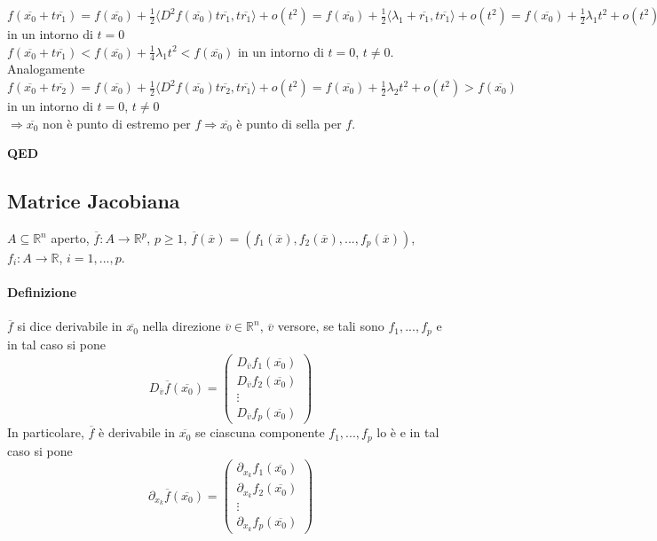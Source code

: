 \documentclass{article}
\newcommand{\R}{\mathbb{R}}
\begin{document}
\begin{enumerate}
    $f(\overline{x_0}+t\overline{r_1})=f(\overline{x_0})+\frac{1}{2}\langle D^2f(\overline{x_0})t\overline{r_1},t\overline{r_1} \rangle + o(t^2)=f(\overline{x_0})+\frac{1}{2}\langle \lambda_1 +\overline{r_1},t\overline{r_1}\rangle + o(t^2)=f(\overline{x_0})+\frac{1}{2}\lambda_1 t^2 + o(t^2)=f(\overline{x_0})+t^2(\frac{1}{2}\lambda_1+o(1)) \Rightarrow \frac{1}{2}\lambda_1+o(1) < \frac{1}{4}\lambda_1$ in un intorno di $t=0$\\
    $f(\overline{x_0}+t\overline{r_1})<f(\overline{x_0})+\frac{1}{4}\lambda_1 t^2< f(\overline{x_0})$ in un intorno di $t=0$, $t\neq 0$.\\
    Analogamente $f(\overline{x_0}+t\overline{r_2})=f(\overline{x_0})+\frac{1}{2}\langle D^2f(\overline{x_0})t\overline{r_2},t\overline{r_1} \rangle +o(t^2)=f(\overline{x_0})+\frac{1}{2}\lambda_2t^2+o(t^2)>f(\overline{x_0})$ in un intorno di $t=0$, $t \neq 0$\\
    $\Rightarrow \overline{x_0}$ non è punto di estremo per $f \Rightarrow \overline{x_0}$ è punto di sella per $f$. 
\end{enumerate}
\begin{flushright}
\textbf{QED}
\end{flushright}


\subsection{{Matrice Jacobiana}}
$A \subseteq \R^n$ aperto, $\overline{f}: A \rightarrow \R^p$, $p \geq 1$, $\overline{f}(\overline{x})=(f_1(\overline{x}),f_2(\overline{x}),...,f_p(\overline{x}))$, $f_i:A \rightarrow \R$, $ i =1,...,p$.

\paragraph{{Definizione}}
$\overline{f}$ si dice derivabile in $\overline{x_0}$ nella direzione $\overline{v}\in \R^n$, $\overline{v}$ versore, se tali sono $f_1,...,f_p$ e in tal caso si pone
\begin{equation*}
    D_{\overline{v}}\overline{f}(\overline{x_0})=\begin{pmatrix}
        D_{\overline{v}}f_1(\overline{x_0})\\
        D_{\overline{v}}f_2(\overline{x_0})\\
        \vdots\\
        D_{\overline{v}}f_p(\overline{x_0})
    \end{pmatrix}
\end{equation*}
In particolare, $\overline{f}$ è derivabile in $\overline{x_0}$ se ciascuna componente $f_1,...,f_p$ lo è e in tal caso si pone 
\begin{equation*}
    \partial_{x_k}\overline{f}(\overline{x_0})=\begin{pmatrix}
        \partial_{x_k}f_1(\overline{x_0})\\
        \partial_{x_k}f_2(\overline{x_0})\\
        \vdots\\
        \partial_{x_k}f_p(\overline{x_0})
    \end{pmatrix}
\end{equation*}
\end{document}

